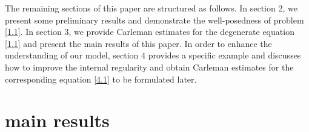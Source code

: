 \documentclass[9pt,reqno]{amsart}
\theoremstyle{plain}
\newtheorem{assumption}[theorem]{Assumption}
\numberwithin{equation}{section}
\numberwithin{theorem}{section}
\def\Om{\Omega}
\DeclareMathOperator*{\Div}{\mathrm{div}}
\def\Om{\Omega}
\begin{document}
	
	The remaining sections of this paper are structured as follows. In section 2, we present some preliminary results and demonstrate the well-posedness of problem \eqref{1.1}. In section 3, we provide Carleman estimates for the degenerate equation \eqref{1.1} and present the main results of this paper. In order to enhance the understanding of our model, section 4 provides a specific example and discusses how to improve the internal regularity and obtain Carleman estimates for the corresponding equation \eqref{4.1} to be formulated later.
	
	
	\section{main results}
	
\end{document}
